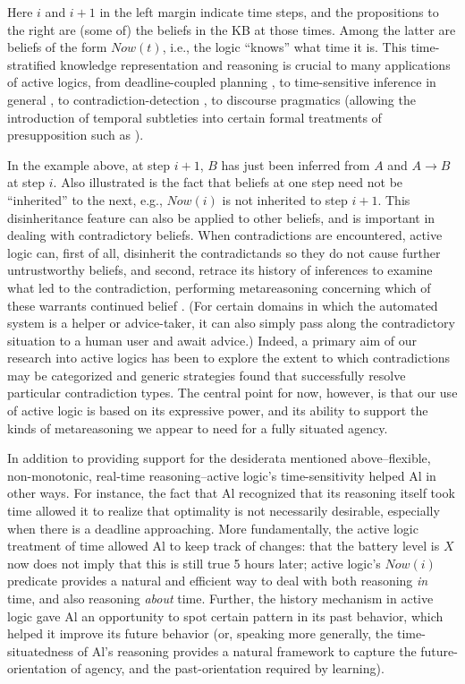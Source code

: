 \documentclass[]{llncs}
\begin{document}
\noindent Here $i$ and $i+1$ in the left margin indicate time steps, and
the propositions to the right are (some of) the beliefs in the KB at those
times. Among the latter are beliefs of the form $\mathit{Now}(t)$, i.e.,
the logic ``knows'' what time it is. This time-stratified knowledge
representation and reasoning is crucial to many applications of active
logics, from deadline-coupled planning
\cite{nirkhe/kraus/miller/perlis:how}, to time-sensitive inference in
general \cite {elgot-drapkin/perlis:reasoning:jetai}, to
contradiction-detection \cite {miller/perlis:presentations}, to
discourse pragmatics \cite {gurney/perlis/purang:interpreting,Traum_ETAI}
(allowing the introduction of temporal subtleties into certain formal
treatments of presupposition such as \cite {heim:presupposition}).
 
In the example above, at step $i+1$, $B$ has just been inferred from $A$
and $A \rightarrow B$ at step $i$.  Also illustrated is the fact that
beliefs at one step need not be ``inherited'' to the next, e.g.,
$\mathit{Now}(i)$ is not inherited to step $i+1$. This disinheritance
feature can also be applied to other beliefs, and is important in dealing
with contradictory beliefs. When contradictions are encountered, active
logic can, first of all, disinherit the contradictands so they do not cause
further untrustworthy beliefs, and second, retrace its history of
inferences to examine what led to the contradiction, performing
metareasoning concerning which of these warrants continued belief
\cite{miller/perlis:presentations,gurney/perlis/purang:interpreting}.  (For
certain domains in which the automated system is a helper or advice-taker,
it can also simply pass along the contradictory situation to a human user
and await advice.) Indeed, a primary aim of our research into active logics
has been to explore the extent to which contradictions may be categorized
and generic strategies found that successfully resolve particular
contradiction types.  The central point for now, however, is that our use
of active logic is based on its expressive power, and its ability to
support the kinds of metareasoning we appear to need for a fully situated
agency.

In addition to providing support for the desiderata mentioned
above--flexible, non-monotonic, real-time reasoning--active logic's
time-sensitivity helped Al in other ways. For instance, the fact that
Al recognized that its reasoning itself took time allowed it to
realize that optimality is not necessarily desirable, especially when
there is a deadline approaching. More fundamentally, the active logic
treatment of time allowed Al to keep track of changes: that the battery
level is \( X \) now does not imply that this is still true 5 hours later;
active logic's \( \mathit{Now}(i) \) predicate provides a natural and 
efficient way to deal with both reasoning {\em in} time, and also 
reasoning {\em about}
time.  Further, the history mechanism in active logic gave Al an opportunity
to spot certain pattern in its past behavior, which helped it improve
its future behavior (or, speaking more generally, the
time-situatedness of Al's reasoning provides a natural framework to capture
the future-orientation of agency, and the past-orientation required
by learning).
\end{document}
